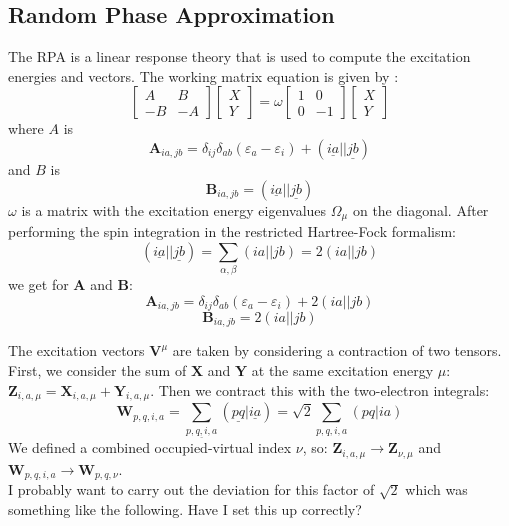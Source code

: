 \documentclass[12pt]{caltech_thesis}
\begin{document}
\subsection{Random Phase Approximation}
The RPA is a linear response theory that is used to compute the excitation energies and vectors. The working matrix equation is given by \autocite{dreuw_single-reference_2005}:
\begin{equation}
\begin{bmatrix}
A & B \\
-B & -A
\end{bmatrix}
\begin{bmatrix}
X \\
Y
\end{bmatrix}
= \omega
\begin{bmatrix}
1 & 0 \\
0 & -1
\end{bmatrix}
\begin{bmatrix}
X \\
Y
\end{bmatrix}
\end{equation}
where $A$ is
\begin{equation}
    \textbf{A}_{ia,jb}=\delta _{ij} \delta _{ab} \left(\varepsilon _{a}-\varepsilon _{i}\right) + (\underline{ia}||\underline{jb})
\end{equation}
and $B$ is
\begin{equation}
    \textbf{B}_{ia,jb}=(\underline{ia}||\underline{jb})
\end{equation}
$\omega $ is a matrix with the excitation energy eigenvalues $\Omega_{\mu}$ on the diagonal. After performing the spin integration in the restricted Hartree-Fock formalism:
\begin{equation}
    (\underline{ia}||\underline{jb}) = \sum_{\alpha ,\beta } (ia||jb) = 2(ia||jb)
\end{equation}
we get for $\textbf{A}$ and $\textbf{B}$:
\begin{equation}
    \textbf{A}_{ia,jb} = \delta _{ij}\delta _{ab}(\varepsilon _{a}- \varepsilon _{i}) + 2(ia||jb)
\end{equation}
\begin{equation}
    \textbf{B}_{ia,jb} = 2(ia||jb)
\end{equation}

The excitation vectors $\textbf{V}^{\mu}$ are taken by considering a contraction of two tensors. First, we consider the sum of $\textbf{X}$ and $\textbf{Y}$ at the same excitation energy $\mu$: $\textbf{Z}_{i,a,\mu} = \textbf{X}_{i,a,\mu} + \textbf{Y}_{i,a,\mu}$. Then we contract this with the two-electron integrals:
\begin{equation}
    \textbf{W}_{p,q,i,a} = \sum_{\underline{p,q,i,a}} (\underline{pq}|\underline{ia}) = \sqrt{2} \sum_{p,q,i,a} (pq|ia)
\end{equation}
We defined a combined occupied-virtual index $\nu$, so: $\textbf{Z}_{i,a,\mu} \rightarrow \textbf{Z}_{\nu, \mu}$ and $\textbf{W}_{p,q,i,a}\rightarrow \textbf{W}_{p,q,\nu}$.\\
I probably want to carry out the deviation for this factor of $\sqrt{2}$ which was something like the following. Have I set this up correctly?
\end{document}
